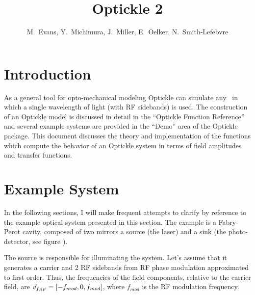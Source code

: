 \documentclass[12pt]{article}
\title{Optickle 2}
\author{M.~Evans, Y.~Michimura, J.~Miller, E.~Oelker, N.~Smith-Lefebvre}
\begin{document}
\maketitle


\section{Introduction}

As a general tool for opto-mechanical modeling Optickle can simulate any \ifo\ in which a
 single wavelength of light (with RF sidebands) is used.
The construction of an Optickle model is discussed in detail in the ``Optickle Function Reference''
 and several example systems are provided in the ``Demo'' area of the Optickle package.
This document discusses the theory and implementation of the functions which
 compute the behavior of an Optickle system in terms of field amplitudes and transfer functions.

\section{Example System}

In the following sections, I will make frequent attempts to clarify by reference to the example optical system presented in this section.
The example is a Fabry-Perot cavity, composed of two mirrors a source (the laser) and a sink (the photo-detector, see figure ).


The source is responsible for illuminating the system.
Let's assume that it generates a carrier and 2 RF sidebands from RF phase modulation approximated to first order.
Thus, the frequencies of the field components, relative to the carrier field, are $\vec{v}_{f_{RF}} = \left[ -f_{mod},0,f_{mod} \right]$, where $f_{mod}$ is the RF modulation frequency.
\end{document}
